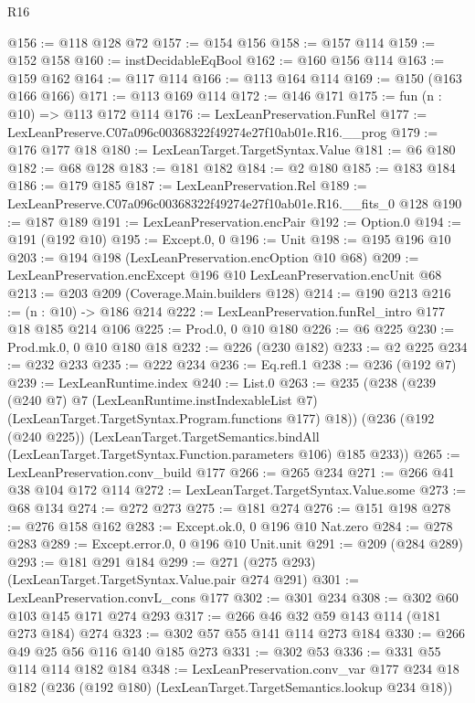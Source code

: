 \begin{lexlean}{R16}
\begin{coremodule}
@156 := @118 @128 @72
@157 := @154 @156
@158 := @157 @114
@159 := @152 @158
@160 := instDecidableEqBool
@162 := @160 @156 @114
@163 := @159 @162
@164 := @117 @114
@166 := @113 @164 @114
@169 := @150 (@163 @166 @166)
@171 := @113 @169 @114
@172 := @146 @171
@175 := fun (n : @10) => @113 @172 @114
@176 := LexLeanPreservation.FunRel
@177 := LexLeanPreserve.C07a096c00368322f49274e27f10ab01e.R16.__prog
@179 := @176 @177 @18
@180 := LexLeanTarget.TargetSyntax.Value
@181 := @6 @180
@182 := @68 @128
@183 := @181 @182
@184 := @2 @180
@185 := @183 @184
@186 := @179 @185
@187 := LexLeanPreservation.Rel
@189 := LexLeanPreserve.C07a096c00368322f49274e27f10ab01e.R16.__fits_0 @128
@190 := @187 @189
@191 := LexLeanPreservation.encPair
@192 := Option.{0}
@194 := @191 (@192 @10)
@195 := Except.{0, 0}
@196 := Unit
@198 := @195 @196 @10
@203 := @194 @198 (LexLeanPreservation.encOption @10 @68)
@209 := LexLeanPreservation.encExcept @196 @10 LexLeanPreservation.encUnit @68
@213 := @203 @209 (Coverage.Main.builders @128)
@214 := @190 @213
@216 := (n : @10) -> @186 @214
@222 := LexLeanPreservation.funRel_intro @177 @18 @185 @214 @106
@225 := Prod.{0, 0} @10 @180
@226 := @6 @225
@230 := Prod.mk.{0, 0} @10 @180 @18
@232 := @226 (@230 @182)
@233 := @2 @225
@234 := @232 @233
@235 := @222 @234
@236 := Eq.refl.{1}
@238 := @236 (@192 @7)
@239 := LexLeanRuntime.index
@240 := List.{0}
@263 := @235
    (@238
      (@239
        (@240 @7)
        @7
        (LexLeanRuntime.instIndexableList @7)
        (LexLeanTarget.TargetSyntax.Program.functions @177)
        @18))
    (@236
      (@192 (@240 @225))
      (LexLeanTarget.TargetSemantics.bindAll
        (LexLeanTarget.TargetSyntax.Function.parameters @106)
        @185
        @233))
@265 := LexLeanPreservation.conv_build @177
@266 := @265 @234
@271 := @266 @41 @38 @104 @172 @114
@272 := LexLeanTarget.TargetSyntax.Value.some
@273 := @68 @134
@274 := @272 @273
@275 := @181 @274
@276 := @151 @198
@278 := @276 @158 @162
@283 := Except.ok.{0, 0} @196 @10 Nat.zero
@284 := @278 @283
@289 := Except.error.{0, 0} @196 @10 Unit.unit
@291 := @209 (@284 @289)
@293 := @181 @291 @184
@299 := @271 (@275 @293) (LexLeanTarget.TargetSyntax.Value.pair @274 @291)
@301 := LexLeanPreservation.convL_cons @177
@302 := @301 @234
@308 := @302 @60 @103 @145 @171 @274 @293
@317 := @266 @46 @32 @59 @143 @114 (@181 @273 @184) @274
@323 := @302 @57 @55 @141 @114 @273 @184
@330 := @266 @49 @25 @56 @116 @140 @185 @273
@331 := @302 @53
@336 := @331 @55 @114 @114 @182 @184
@348 := LexLeanPreservation.conv_var
    @177
    @234
    @18
    @182
    (@236 (@192 @180) (LexLeanTarget.TargetSemantics.lookup @234 @18))

\end{coremodule}
\end{lexlean}
